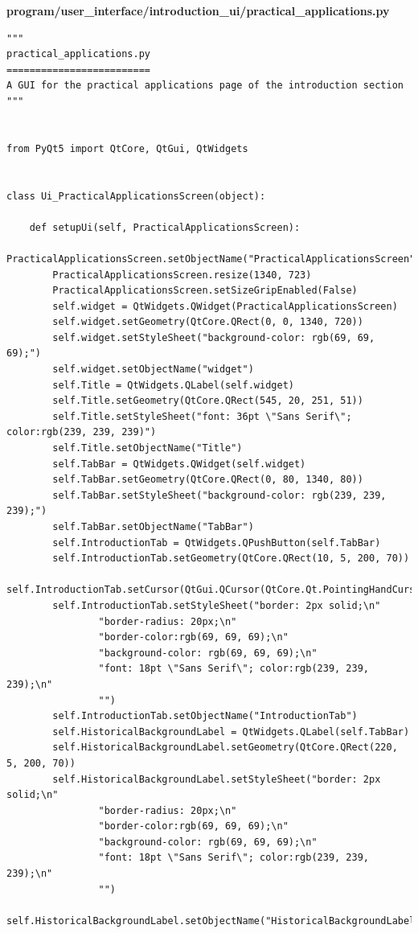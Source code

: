 \documentclass{article}
\begin{document}
\textbf{program/user\_interface/introduction\_ui/practical\_applications.py}

\begin{lstlisting}
"""
practical_applications.py
=========================
A GUI for the practical applications page of the introduction section
"""


from PyQt5 import QtCore, QtGui, QtWidgets


class Ui_PracticalApplicationsScreen(object):

    def setupUi(self, PracticalApplicationsScreen):
        PracticalApplicationsScreen.setObjectName("PracticalApplicationsScreen")
        PracticalApplicationsScreen.resize(1340, 723)
        PracticalApplicationsScreen.setSizeGripEnabled(False)
        self.widget = QtWidgets.QWidget(PracticalApplicationsScreen)
        self.widget.setGeometry(QtCore.QRect(0, 0, 1340, 720))
        self.widget.setStyleSheet("background-color: rgb(69, 69, 69);")
        self.widget.setObjectName("widget")
        self.Title = QtWidgets.QLabel(self.widget)
        self.Title.setGeometry(QtCore.QRect(545, 20, 251, 51))
        self.Title.setStyleSheet("font: 36pt \"Sans Serif\"; color:rgb(239, 239, 239)")
        self.Title.setObjectName("Title")
        self.TabBar = QtWidgets.QWidget(self.widget)
        self.TabBar.setGeometry(QtCore.QRect(0, 80, 1340, 80))
        self.TabBar.setStyleSheet("background-color: rgb(239, 239, 239);")
        self.TabBar.setObjectName("TabBar")
        self.IntroductionTab = QtWidgets.QPushButton(self.TabBar)
        self.IntroductionTab.setGeometry(QtCore.QRect(10, 5, 200, 70))
        self.IntroductionTab.setCursor(QtGui.QCursor(QtCore.Qt.PointingHandCursor))
        self.IntroductionTab.setStyleSheet("border: 2px solid;\n"
                "border-radius: 20px;\n"
                "border-color:rgb(69, 69, 69);\n"
                "background-color: rgb(69, 69, 69);\n"
                "font: 18pt \"Sans Serif\"; color:rgb(239, 239, 239);\n"
                "")
        self.IntroductionTab.setObjectName("IntroductionTab")
        self.HistoricalBackgroundLabel = QtWidgets.QLabel(self.TabBar)
        self.HistoricalBackgroundLabel.setGeometry(QtCore.QRect(220, 5, 200, 70))
        self.HistoricalBackgroundLabel.setStyleSheet("border: 2px solid;\n"
                "border-radius: 20px;\n"
                "border-color:rgb(69, 69, 69);\n"
                "background-color: rgb(69, 69, 69);\n"
                "font: 18pt \"Sans Serif\"; color:rgb(239, 239, 239);\n"
                "")
        self.HistoricalBackgroundLabel.setObjectName("HistoricalBackgroundLabel")

\end{lstlisting}
\end{document}
